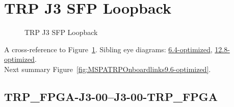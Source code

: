 

% 

\section{TRP J3 SFP Loopback}\label{sec:TRPJ3SFPLoopback9.6-optimized}

\begin{figure}[h] %
\begin{subfigure}{1\textwidth}
\hyperref[sec:TRPFPGAJ300J300TRPFPGA9.6-optimized]{}
\end{subfigure}

\caption{TRP J3 SFP Loopback} \label{fig:TRPJ3SFPLoopback9.6-optimized}
\end{figure}

A cross-reference to Figure~\ref{fig:TRPJ3SFPLoopback9.6-optimized}.
Sibling eye diagrams: \hyperref[sec:TRPJ3SFPLoopback6.4-optimized]{6.4-optimized}, \hyperref[sec:TRPJ3SFPLoopback12.8-optimized]{12.8-optimized}. \\
Next summary Figure~\ref{fig:MSPATRPOnboardlinks9.6-optimized}.
\clearpage
% 
\subsection{TRP\_FPGA-J3-00--J3-00-TRP\_FPGA}\label{sec:TRPFPGAJ300J300TRPFPGA9.6-optimized}

